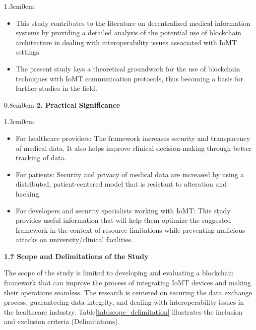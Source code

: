 \documentclass[12pt, a4paper]{report}
\begin{document}
\begin{adjustwidth}{1.3cm}{0cm}
\vspace{-1.0em}
  \begin{itemize}[nosep, topsep=0pt, partopsep=0pt, leftmargin=*]
    \item This study contributes to the literature on decentralized medical information systems by providing a detailed analysis of the potential use of blockchain architecture in dealing with interoperability issues associated with IoMT settings. 
    \item The present study lays a theoretical groundwork for the use of blockchain techniques with IoMT communication protocols, thus becoming a basis for further studies in the field. 
\end{itemize}  
\end{adjustwidth}


\vspace{0.3cm}
\begin{adjustwidth}{0.8cm}{0cm}
    {\color{myblue} \bfseries 2. Practical Significance}
\end{adjustwidth}
\begin{adjustwidth}{1.3cm}{0cm}
\vspace{-1.0em}
  \begin{itemize}[nosep, topsep=0pt, partopsep=0pt, leftmargin=*]
    \item For healthcare providers: The framework increases security and transparency of medical data. It also helps improve clinical decision-making through better tracking of data.
    \item For patients: Security and privacy of medical data are increased by using a distributed, patient-centered model that is resistant to alteration and hacking.
    \item For developers and security specialists working with IoMT: This study provides useful information that will help them optimize the suggested framework in the context of resource limitations while preventing malicious attacks on university/clinical facilities.
\end{itemize}  
\end{adjustwidth}


\vspace{0.5cm}
{\color{myblue} \Large \bfseries 1.7 Scope and Delimitations of the Study}

\noindent The scope of the study is limited to developing and evaluating a blockchain framework that can improve the process of integrating IoMT devices and making their operations seamless. The research is centered on securing the data exchange process, guaranteeing data integrity, and dealing with interoperability issues in the healthcare industry. Table\ref{tab:scope_delimitation} illustrates the inclusion and exclusion criteria (Delimitations).
\end{document}
